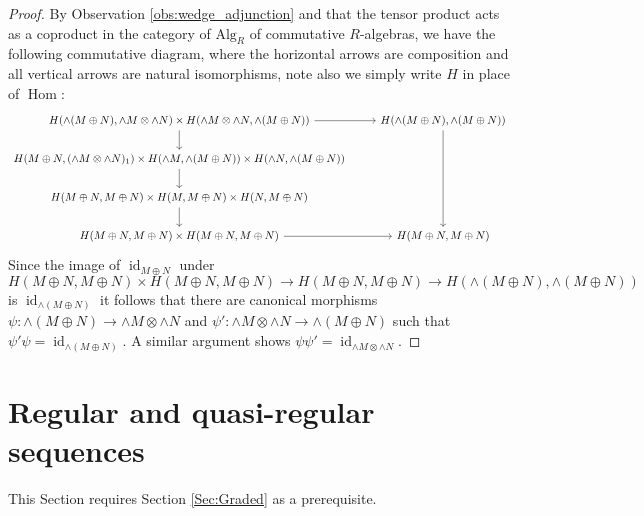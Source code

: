 \documentclass[12pt]{article}
\theoremstyle{plain}
\theoremstyle{definition}
\newcommand{\lto}{\longrightarrow}
\begin{document}
\begin{proof}
	By Observation \ref{obs:wedge_adjunction} and that the tensor product acts as a coproduct in the category of $\text{Alg}_R$ of commutative $R$-algebras, we have the following commutative diagram, where the horizontal arrows are composition and all vertical arrows are natural isomorphisms, note also we simply write $H$ in place of $\operatorname{Hom}$:
	\begin{equation}
		\begin{tikzcd}
			H(\wedge(M \oplus N), \wedge M \otimes \wedge N) \times H(\wedge M \otimes \wedge N, \wedge(M \oplus N))\arrow[r]\arrow[d] & H(\wedge(M \oplus N), \wedge(M \oplus N))\arrow[ddd]\\
			H(M \oplus N, (\wedge M \otimes \wedge N)_1) \times H(\wedge M, \wedge(M \oplus N)) \times H(\wedge N, \wedge(M \oplus N))\arrow[d]\\
			H(M \oplus N, M \oplus N) \times H(M, M\oplus N) \times H(N, M \oplus N)\arrow[d]\\
			H(M \oplus N, M \oplus N) \times H(M \oplus N, M \oplus N)\arrow[r] & H(M \oplus N, M \oplus N)
		\end{tikzcd}
	\end{equation}
	Since the image of $\operatorname{id}_{M \oplus N}$ under
	\begin{equation}
		H(M \oplus N, M \oplus N) \times H(M \oplus N, M \oplus N)\lto H(M \oplus N, M \oplus N) \lto H(\wedge(M \oplus N), \wedge(M \oplus N))
	\end{equation}
	is $\operatorname{id}_{\wedge(M \oplus N)}$ it follows that there are canonical morphisms $\psi: \wedge(M \oplus N) \lto \wedge M \otimes \wedge N$ and $\psi': \wedge M \otimes \wedge N \lto \wedge (M \oplus N)$ such that $\psi' \psi = \operatorname{id}_{\wedge(M \oplus N)}$. A similar argument shows $\psi \psi' = \operatorname{id}_{\wedge M \otimes \wedge N}$.
\end{proof}
\section{Regular and quasi-regular sequences}
This Section requires Section \ref{Sec:Graded} as a prerequisite.
\end{document}

